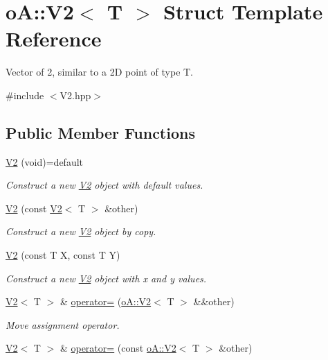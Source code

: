 \hypertarget{structo_a_1_1_v2}{}\section{oA\+:\+:V2$<$ T $>$ Struct Template Reference}
\label{structo_a_1_1_v2}


Vector of 2, similar to a 2D point of type T.  




{\ttfamily \#include $<$V2.\+hpp$>$}

\subsection*{Public Member Functions}
\begin{DoxyCompactItemize}
\item 
\mbox{\hyperlink{structo_a_1_1_v2_a6b62d1b3e8de957a3c2d26925b6508e1}{V2}} (void)=default
\begin{DoxyCompactList}\small\item\em Construct a new \mbox{\hyperlink{structo_a_1_1_v2}{V2}} object with default values. \end{DoxyCompactList}\item 
\mbox{\hyperlink{structo_a_1_1_v2_adb120ae33b44a00dd2b40136283422eb}{V2}} (const \mbox{\hyperlink{structo_a_1_1_v2}{V2}}$<$ T $>$ \&other)
\begin{DoxyCompactList}\small\item\em Construct a new \mbox{\hyperlink{structo_a_1_1_v2}{V2}} object by copy. \end{DoxyCompactList}\item 
\mbox{\hyperlink{structo_a_1_1_v2_a382c0ae0124a0dd755ce870f40651a41}{V2}} (const T X, const T Y)
\begin{DoxyCompactList}\small\item\em Construct a new \mbox{\hyperlink{structo_a_1_1_v2}{V2}} object with x and y values. \end{DoxyCompactList}\item 
\mbox{\hyperlink{structo_a_1_1_v2}{V2}}$<$ T $>$ \& \mbox{\hyperlink{structo_a_1_1_v2_ac8fc6159c4258a767540f8af7971348b}{operator=}} (\mbox{\hyperlink{structo_a_1_1_v2}{o\+A\+::\+V2}}$<$ T $>$ \&\&other)
\begin{DoxyCompactList}\small\item\em Move assignment operator. \end{DoxyCompactList}\item 
\mbox{\hyperlink{structo_a_1_1_v2}{V2}}$<$ T $>$ \& \mbox{\hyperlink{structo_a_1_1_v2_a144fb5845961c65ae8d6417ecca9e395}{operator=}} (const \mbox{\hyperlink{structo_a_1_1_v2}{o\+A\+::\+V2}}$<$ T $>$ \&other)

\end{DoxyCompactItemize}
